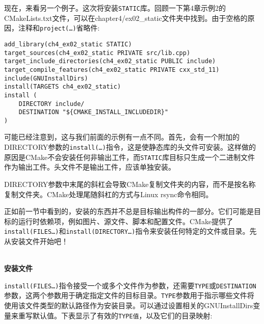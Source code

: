 现在，来看另一个例子。这次将安装\texttt{STATIC}库。回顾一下第4章示例2的CMakeLists.txt文件，可以在chapter4/ex02\_static文件夹中找到。由于空格的原因，注释和\texttt{project(…)}省略件:

\begin{lstlisting}[style=styleCMake]
add_library(ch4_ex02_static STATIC)
target_sources(ch4_ex02_static PRIVATE src/lib.cpp)
target_include_directories(ch4_ex02_static PUBLIC include)
target_compile_features(ch4_ex02_static PRIVATE cxx_std_11)
include(GNUInstallDirs)
install(TARGETS ch4_ex02_static)
install (
	DIRECTORY include/
	DESTINATION "${CMAKE_INSTALL_INCLUDEDIR}"
)
\end{lstlisting}

可能已经注意到，这与我们前面的示例有一点不同。首先，会有一个附加的DIRECTORY参数的\texttt{install(…)}指令，这是使静态库的头文件可安装。这样做的原因是CMake不会安装任何非输出工件，而\texttt{STATIC}库目标只生成一个二进制文件作为输出工件。头文件不是输出工件，应该单独安装。

\begin{tcolorbox}[colback=webgreen!5!white,colframe=webgreen!75!black,title=Note]
DIRECTORY参数中末尾的斜杠会导致CMake复制文件夹的内容，而不是按名称复制文件夹。CMake处理尾随斜杠的方式与Linux rsync命令相同。
\end{tcolorbox}


正如前一节中看到的，安装的东西并不总是目标输出构件的一部分。它们可能是目标的运行时依赖项，例如图片、源文件、脚本和配置文件。CMake提供了\texttt{install(FILES…)}和\texttt{install(DIRECTORY…)}指令来安装任何特定的文件或目录。先从安装文件开始吧！

\hspace*{\fill} \\ %
\noindent
\textbf{安装文件}
 
\texttt{install(FILES…)}指令接受一个或多个文件作为参数，还需要\texttt{TYPE}或\texttt{DESTINATION}参数，这两个参数用于确定指定文件的目标目录。\texttt{TYPE}参数用于指示哪些文件将使用该文件类型的默认路径作为安装目录。可以通过设置相关的GNUInstallDirs变量来重写默认值。下表显示了有效的\texttt{TYPE值}，以及它们的目录映射:

